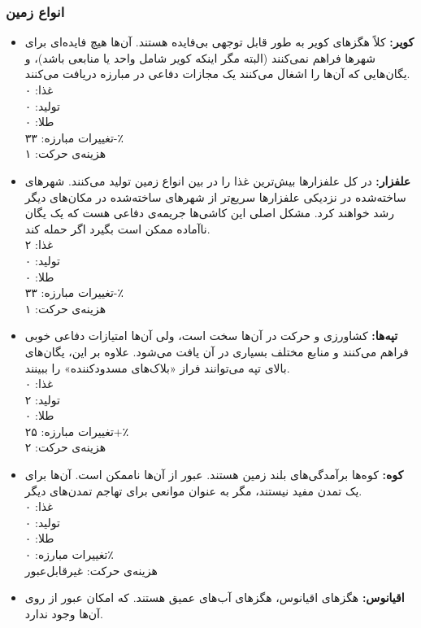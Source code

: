 \documentclass[]{article}
\begin{document}
\subsubsection*{{\titr انواع زمین}}
\begin{itemize}
	\item \textbf{کویر:} کلاً هگزهای کویر به طور قابل توجهی بی‌فایده هستند. آن‌ها هیچ فایده‌ای برای شهرها فراهم نمی‌کنند (البته مگر اینکه کویر شامل واحد یا منابعی باشد)، و یگان‌هایی که آن‌ها را اشغال می‌کنند یک مجازات دفاعی  در مبارزه دریافت می‌کنند.\\
	غذا: ۰\\
	تولید: ۰\\
	طلا: ۰\\
	تغییرات مبارزه: ۳۳-٪\\
	هزینه‌ی حرکت: ۱
	\item \textbf{علفزار:} در کل علفزارها بیش‌ترین غذا را در بین انواع زمین تولید می‌کنند. شهرهای ساخته‌شده در نزدیکی علفزارها سریع‌تر از شهرهای ساخته‌شده در مکان‌های دیگر رشد خواهند کرد. مشکل اصلی این کاشی‌ها جریمه‌ی دفاعی هست که یک یگان ناآماده ممکن است بگیرد اگر حمله کند.\\
	غذا: ۲\\
	تولید: ۰\\
	طلا: ۰\\
	تغییرات مبارزه: ۳۳-٪\\
	هزینه‌ی حرکت: ۱
	\item \textbf{تپه‌ها:} کشاورزی و حرکت در آن‌ها سخت است، ولی آن‌ها امتیازات دفاعی خوبی فراهم می‌کنند و منابع مختلف بسیاری در آن یافت می‌شود. علاوه بر این، یگان‌های بالای تپه می‌توانند فراز «بلاک‌های مسدودکننده» را ببینند.\\
	غذا: ۰\\
	تولید: ۲\\
	طلا: ۰\\
	تغییرات مبارزه: ۲۵+٪\\
	هزینه‌ی حرکت: ۲
	\item \textbf{کوه:} کوه‌ها برآمدگی‌های بلند زمین هستند. عبور از آن‌ها ناممکن است. آن‌ها برای یک تمدن مفید نیستند، مگر به عنوان موانعی برای تهاجم تمدن‌های دیگر.\\
	غذا: ۰\\
	تولید: ۰\\
	طلا: ۰\\
	تغییرات مبارزه: ۰٪\\
	هزینه‌ی حرکت: غیرقابل‌عبور
	\item \textbf{اقیانوس:} هگزهای اقیانوس، هگزهای آب‌های عمیق هستند. که امکان عبور از روی آن‌ها وجود ندارد.\\

\end{itemize}
\end{document}
